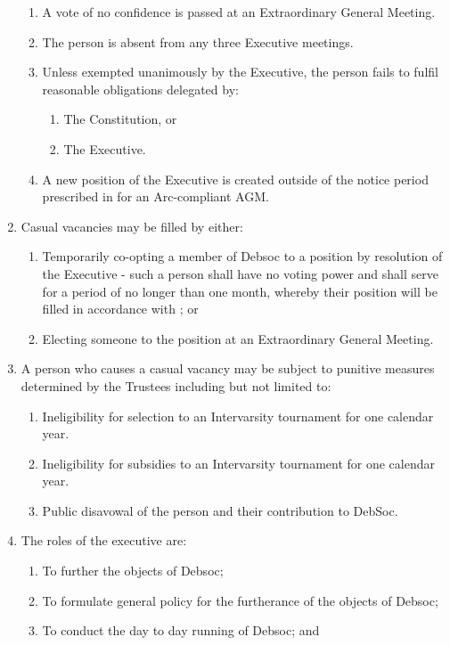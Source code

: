 \begin{enumerate}
\begin{enumerate}
  \item A vote of no confidence is passed at an Extraordinary General Meeting.
  \item The person is absent from any three Executive meetings.
  \item Unless exempted unanimously by the Executive, the person fails to fulfil reasonable obligations delegated by:
    \begin{enumerate}
    \item The Constitution, or
    \item The Executive.
    \end{enumerate}
  \item A new position of the Executive is created outside of the notice period prescribed in  for an Arc-compliant AGM.
  \end{enumerate}
\item Casual vacancies may be filled by either:
  \begin{enumerate}
  \item Temporarily co-opting a member of Debsoc to a position by resolution of the Executive - such a person shall have no voting power and shall serve for a period of no longer than one month, whereby their position will be filled in accordance with ; or
  \item Electing someone to the position at an Extraordinary General Meeting. \label{vacancy_egm}
  \end{enumerate}
\item A person who causes a casual vacancy may be subject to punitive measures determined by the Trustees including but not limited to:
  \begin{enumerate}
  \item Ineligibility for selection to an Intervarsity tournament for one calendar year.
  \item Ineligibility for subsidies to an Intervarsity tournament for one calendar year.
  \item Public disavowal of the person and their contribution to DebSoc.
  \end{enumerate}
\item The roles of the executive are:
  \begin{enumerate}
  \item To further the objects of Debsoc;
  \item To formulate general policy for the furtherance of the objects of Debsoc;
  \item To conduct the day to day running of Debsoc; and

\end{enumerate}
\end{enumerate}
